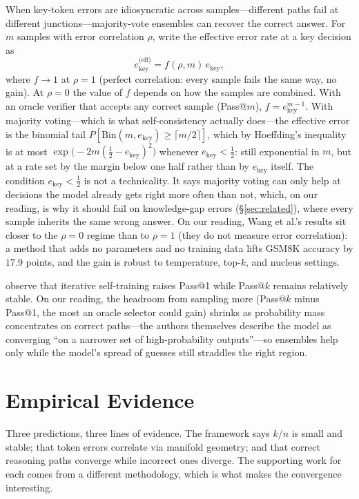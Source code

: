 When key-token errors are idiosyncratic across samples---different paths fail at different junctions---majority-vote ensembles can recover the correct answer. For $m$ samples with error correlation $\rho$, write the effective error rate at a key decision as
\begin{equation}
\label{eq:ensemble}
e_{\text{key}}^{\text{(eff)}} = f(\rho, m)\, e_{\text{key}},
\end{equation}
where $f \to 1$ at $\rho = 1$ (perfect correlation: every sample fails the same way, no gain). At $\rho = 0$ the value of $f$ depends on how the samples are combined. With an oracle verifier that accepts any correct sample (Pass@$m$), $f = e_{\text{key}}^{m-1}$. With majority voting---which is what self-consistency actually does---the effective error is the binomial tail $P[\mathrm{Bin}(m, e_{\text{key}}) \ge \lceil m/2 \rceil]$, which by Hoeffding's inequality is at most $\exp\!\big(-2m(\tfrac12 - e_{\text{key}})^2\big)$ whenever $e_{\text{key}} < \tfrac12$: still exponential in $m$, but at a rate set by the margin below one half rather than by $e_{\text{key}}$ itself. The condition $e_{\text{key}} < \tfrac12$ is not a technicality. It says majority voting can only help at decisions the model already gets right more often than not, which, on our reading, is why it should fail on knowledge-gap errors (\S\ref{sec:related}), where every sample inherits the same wrong answer. On our reading, Wang et al.'s results \citep{wang2023self} sit closer to the $\rho = 0$ regime than to $\rho = 1$ (they do not measure error correlation): a method that adds no parameters and no training data lifts GSM8K accuracy by $17.9$ points, and the gain is robust to temperature, top-$k$, and nucleus settings.

\citet{costello2025think} observe that iterative self-training raises Pass@1 while Pass@$k$ remains relatively stable. On our reading, the headroom from sampling more (Pass@$k$ minus Pass@1, the most an oracle selector could gain) shrinks as probability mass concentrates on correct paths---the authors themselves describe the model as converging ``on a narrower set of high-probability outputs''---so ensembles help only while the model's spread of guesses still straddles the right region.

\section{Empirical Evidence}
\label{sec:evidence}

Three predictions, three lines of evidence. The framework says $k/n$ is small and stable; that token errors correlate via manifold geometry; and that correct reasoning paths converge while incorrect ones diverge. The supporting work for each comes from a different methodology, which is what makes the convergence interesting.

